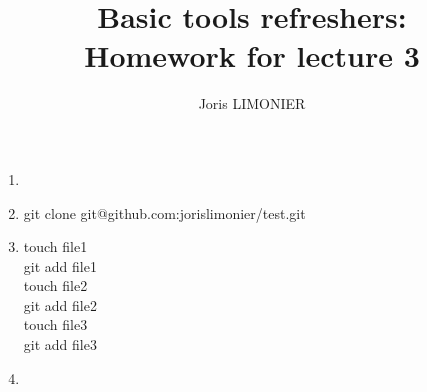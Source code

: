 \documentclass{article}
\title{Basic tools refreshers:\\Homework for lecture 3}
\author{Joris LIMONIER}
\begin{document}
\maketitle


\begin{enumerate}
  \item
  \item git clone git@github.com:jorislimonier/test.git
  \item touch file1 \\
        git add file1 \\
        touch file2 \\
        git add file2 \\
        touch file3 \\
        git add file3
  \item 
\end{enumerate}
\end{document}
